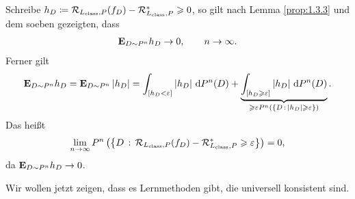 Schreibe $h_D \coloneq \mathcal{R}_{L_{\mathrm{class}},P}(f_D) - \mathcal{R}_{L_{\mathrm{class}},P}^* \geqslant 0$, so gilt
nach Lemma \ref{prop:1.3.3} und dem soeben gezeigten, dass
\begin{align*}
\textbf{E}_{D\sim P^n} h_D \to 0,\qquad n\to\infty. 
\end{align*}
Ferner gilt
\begin{align*}
\textbf{E}_{D\sim P^n} h_D = \textbf{E}_{D\sim P^n} \left|h_D\right| =
\int_{[h_D< \varepsilon]} \left|h_D\right|\,\mathrm{d} P^n(D)
+
\underbrace{\int_{[h_D\geqslant \varepsilon]} \left|h_D\right|\,\mathrm{d} P^n(D)}_{\geqslant \varepsilon
P^n(\left\{ D\,:\,\left|h_D\right| \geqslant \varepsilon\right\})}.
\end{align*}
Das heißt
\begin{align*}
\lim\limits_{n\to\infty}
P^n\left(\left\{ D\,:\,\mathcal{R}_{L_{\mathrm{class}},P}(f_D) - \mathcal{R}_{L_{\mathrm{class}},P}^* \geqslant \varepsilon\right\}\right) =
0,
\end{align*}
da $\textbf{E}_{D\sim P^n} h_D \to 0$.

Wir wollen jetzt zeigen, dass es Lernmethoden gibt, die universell konsistent
sind.

